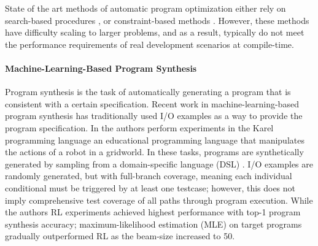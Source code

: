 \documentclass{article}
\begin{document}
State of the art methods of automatic program optimization either rely on search-based procedures \citep{schkufza2013stochastic}, or constraint-based methods \citep{sasnauskas2017}. However, these methods have difficulty scaling to larger problems, and as a result, typically do not meet the performance requirements of real development scenarios at compile-time.





\paragraph{Machine-Learning-Based Program Synthesis} Program synthesis is the task of automatically generating a program that is consistent with a certain specification. Recent work in machine-learning-based program synthesis has traditionally used I/O examples as a way to provide the program specification. In \cite{bunel2018leveraging} the authors perform experiments in the Karel programming language \cite{pattis1981karel} an educational programming language that manipulates the actions of a robot in a gridworld.
In these tasks, programs are synthetically generated by sampling from a domain-specific language (DSL) . I/O examples are randomly generated, but with full-branch coverage, meaning each individual conditional must be triggered by at least one  testcase; however, this does not imply comprehensive test coverage of all paths through program execution. While the authors RL experiments achieved highest performance with top-1 program synthesis accuracy; maximum-likelihood estimation (MLE) on target programs gradually outperformed RL as the beam-size increased to 50. 
\end{document}
